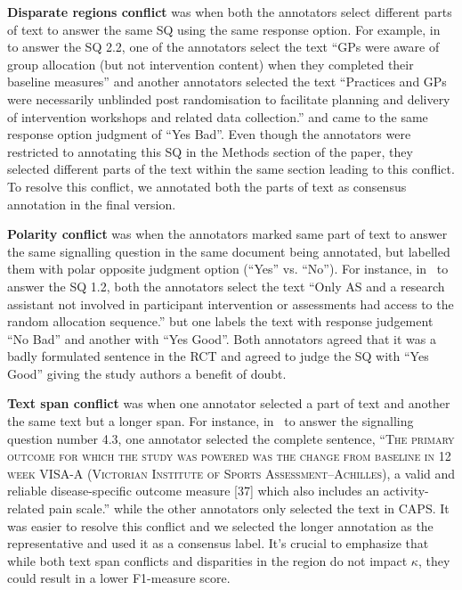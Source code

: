 \documentclass[sn-mathphys,Numbered]{sn-jnl}%
\theoremstyle{thmstyleone}%
\theoremstyle{thmstyletwo}%
\theoremstyle{thmstylethree}%
\begin{document}
\textbf{Disparate regions conflict} was when both the annotators select different parts of text to answer the same SQ using the same response option.
For example, in~\cite{darlow2019fear} to answer the SQ 2.2, one of the annotators select the text ``GPs were aware of group allocation (but not intervention content) when they completed their baseline measures'' and another annotators selected the text ``Practices and GPs were necessarily unblinded post randomisation to facilitate planning and delivery of intervention workshops and related data collection.'' and came to the same response option judgment of ``Yes Bad''.
Even though the annotators were restricted to annotating this SQ in the Methods section of the paper, they selected different parts of the text within the same section leading to this conflict.
To resolve this conflict, we annotated both the parts of text as consensus annotation in the final version.

\textbf{Polarity conflict} was when the annotators marked same part of text to answer the same signalling question in the same document being annotated, but labelled them with polar opposite judgment option (``Yes'' vs. ``No'').
For instance, in~\cite{solomons2020intramuscular} to answer the SQ 1.2, both the annotators select the text ``Only AS and a research assistant not involved in participant intervention or assessments had access to the random allocation sequence.'' but one labels the text with response judgement ``No Bad'' and another with ``Yes Good''.
Both annotators agreed that it was a badly formulated sentence in the RCT and agreed to judge the SQ with ``Yes Good'' giving the study authors a benefit of doubt. 

\textbf{Text span conflict} was when one annotator selected a part of text and another the same text but a longer span.
For instance, in~\cite{solomons2020intramuscular} to answer the signalling question number 4.3, one annotator selected the complete sentence, ``\textsc{The primary outcome for which the study was powered was the change from baseline in 12 week VISA-A (Victorian Institute of Sports Assessment–Achilles),} a valid and reliable disease-specific outcome measure [37] which also includes an activity-related pain scale.'' while the other annotators only selected the text in CAPS. 
It was easier to resolve this conflict and we selected the longer annotation as the representative and used it as a consensus label.
It's crucial to emphasize that while both text span conflicts and disparities in the region do not impact $\kappa$, they could result in a lower F1-measure score.
%
%
%
\end{document}
